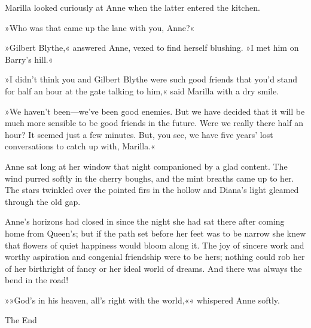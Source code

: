 Marilla looked curiously at Anne when the latter entered the kitchen.

»Who was that came up the lane with you, Anne?«

»Gilbert Blythe,« answered Anne, vexed to find herself blushing. »I met him on Barry's hill.«

»I didn't think you and Gilbert Blythe were such good friends that you'd stand for half an hour at the gate talking to him,« said Marilla with a dry smile.

»We haven't been—we've been good enemies. But we have decided that it will be much more sensible to be good friends in the future. Were we really there half an hour? It seemed just a few minutes. But, you see, we have five years' lost conversations to catch up with, Marilla.«

Anne sat long at her window that night companioned by a glad content. The wind purred softly in the cherry boughs, and the mint breaths came up to her. The stars twinkled over the pointed firs in the hollow and Diana's light gleamed through the old gap.

Anne's horizons had closed in since the night she had sat there after coming home from Queen's; but if the path set before her feet was to be narrow she knew that flowers of quiet happiness would bloom along it. The joy of sincere work and worthy aspiration and congenial friendship were to be hers; nothing could rob her of her birthright of fancy or her ideal world of dreams. And there was always the bend in the road!

»»God's in his heaven, all's right with the world,«« whispered Anne softly.

\makeatletter
{}
{%
}{%
	\begin{center}\mytitlefont\reasonablyhuge
		The End
	\end{center}
}
\makeatother